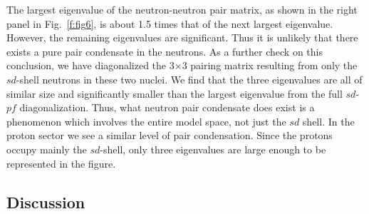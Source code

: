 \begin{multicols}{2}
The largest eigenvalue of the neutron-neutron pair matrix, as
shown in the right panel in Fig.~\ref{f:fig6},
is about 1.5 times that of the next largest eigenvalue.
However, the remaining eigenvalues are significant.
Thus it is unlikely that there
exists  a pure pair condensate in the neutrons.
As a further check on this conclusion, we have diagonalized the
3$\times$3 pairing matrix resulting from only the $sd$-shell
neutrons in these two nuclei.  We find that the three eigenvalues are
all of similar size and significantly smaller than the largest eigenvalue
from the full $sd$-$pf$ diagonalization.  Thus, what
neutron pair condensate does
exist is a phenomenon which involves the entire model space, not just
the $sd$ shell.
In the proton sector we see a similar level of
pair condensation. Since the protons occupy
mainly the $sd$-shell, only three eigenvalues are large enough to be
represented in the figure.

\subsection{Discussion}


\end{multicols}

